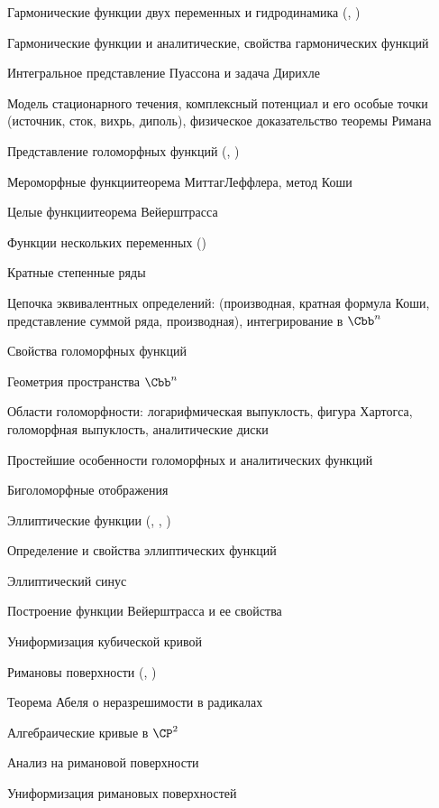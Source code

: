 \documentclass[a4paper]{article}
\begin{document}
\begin{nums}{-2}
\item Гармонические функции двух переменных и гидродинамика (\cite{shabat-first}, \cite{lavr-shabat})
  \begin{items}{-2}
    \item Гармонические функции и аналитические, свойства гармонических функций
    \item Интегральное представление Пуассона и задача Дирихле
    \item Модель стационарного течения, комплексный потенциал и его особые точки
          (источник, сток, вихрь, диполь), физическое доказательство теоремы Римана
  \end{items}
\item Представление голоморфных функций (\cite{shabat-first}, \cite{sid-fed-shab})
  \begin{items}{-2}
    \item Мероморфные функции\т теорема Миттаг\ч Леффлера, метод Коши
    \item Целые функции\т теорема Вейерштрасса
  \end{items}
\item Функции нескольких переменных (\cite{shabat-second})
  \begin{items}{-2}
    \item Кратные степенные ряды
    \item Цепочка эквивалентных определений: (производная, кратная формула Коши,
           представление суммой ряда, производная), интегрирование в $\Cbb^n$
    \item Свойства голоморфных функций
    \item Геометрия пространства $\Cbb^n$
    \item Области голоморфности: логарифмическая выпуклость, фигура Хартогса,
             голоморфная выпуклость,  аналитические диски
    \item Простейшие особенности голоморфных и аналитических функций
    \item Биголоморфные отображения
  \end{items}
\item Эллиптические функции (\cite{shabat-first}, \cite{lavr-shabat}, \cite{gurvitz-courant})
  \begin{items}{-2}
    \item Определение и свойства эллиптических функций
    \item Эллиптический синус
    \item Построение функции Вейерштрасса и ее свойства
    \item Униформизация кубической кривой
  \end{items}
\item Римановы поверхности (\cite{gurvitz-courant}, \cite{alexeev})
  \begin{items}{-2}
    \item Теорема Абеля о неразрешимости в радикалах
    \item Алгебраические кривые в $\CP^2$
    \item Анализ на римановой поверхности
    \item Униформизация римановых поверхностей
  \end{items}
\end{nums}
\end{document}
